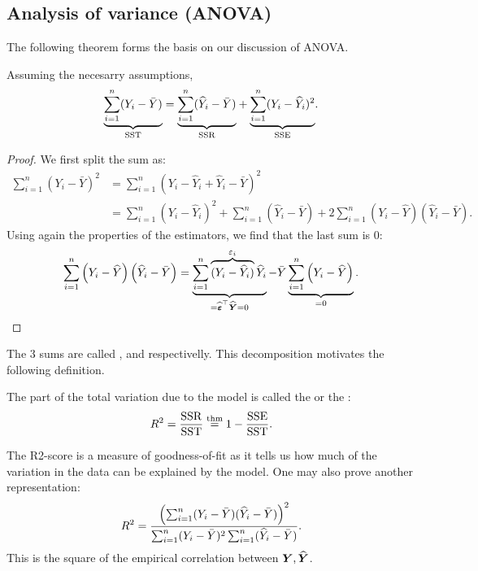 \subsection{Analysis of variance (ANOVA)}
The following theorem forms the basis on our discussion of ANOVA. 
\begin{theorem} \label{thm:ANOVA}
    Assuming the necesarry assumptions, 
    $$
    \underset{\mathrm{SST}}{\underbrace{
        \sum_{i=1}^n (Y_i - \bar{Y})}} = 
    \underset{\mathrm{SSR}}{\underbrace{
        \sum_{i=1}^n (\widehat{Y}_i - \bar{Y})}} + 
    \underset{\mathrm{SSE}}{\underbrace{
        \sum_{i=1}^n (Y_i - \widehat{Y}_i)^2}}. 
    $$
\end{theorem}
\begin{proof}
    We first split the sum as:
    \begin{align*}
        \sum_{i=1}^{n}\left(Y_{i}-\bar{Y}\right)^{2}
        &=\sum_{i=1}^{n}\left(Y_{i}-\hat{Y}_{i}+\hat{Y}_{i}-\bar{Y}\right)^{2}
        \\&= \sum_{i=1}^{n}\left(Y_{i}-\hat{Y}_{i}\right)^{2}+\sum_{i=1}^{n}\left(\hat{Y}_{i}-\bar{Y}\right) 
        +2{\sum_{i=1}^{n}\left(Y_{i}-\hat{Y}\right)\left(\hat{Y}_{i}-\bar{Y}\right)}.
    \end{align*}
    Using again the properties of the estimators, we find that the last sum is $0$:
    $$
        \sum_{i=1}^{n}\left(Y_{i}-\widehat{Y}\right)\left(\widehat{Y}_{i}-\bar{Y}\right)
        =
        \underbrace{\sum_{i=1}^{n} \overbrace{(Y_i-\widehat{Y}_i)}^{\varepsilon_i}\widehat{Y}_{i}}_{=\widehat{\boldsymbol{\varepsilon}}^\top\widehat{\boldsymbol{Y}}=0}
        -\bar{Y}\underbrace{\sum_{i=1}^{n}\left(Y_{i}-\widehat{Y}\right)}_{=0}.
    $$
\end{proof}
The 3 sums are called ,  and  respectivelly. 
This decomposition motivates the following definition. 
\begin{definition}
    The part of the total variation due to the model is called the  or the :
    $$
        R^2 = \frac{\mathrm{SSR}}{\mathrm{SST}} \overset{\mathrm{thm}} = 1 - \frac{\mathrm{SSE}}{\mathrm{SST}}.
    $$
\end{definition}
The R2-score is a measure of goodness-of-fit as it tells us how much of the variation in the data can be explained by the model. One may also prove another representation:
$$
    R^2 = \frac{\left( \sum_{i=1}^n(Y_i-\bar{Y})(\widehat{Y}_i-\bar{Y}) \right)^2}{\sum_{i=1}^n(Y_i-\bar{Y})^2\sum_{i=1}^n(\widehat{Y}_i-\bar{Y})}.
$$
This is the square of the empirical correlation between $\boldsymbol{Y}, \widehat{\boldsymbol{Y}}$.


